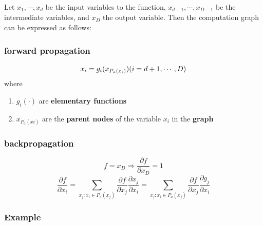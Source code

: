 Let $x_1, \cdots , x_d$ be the input variables to the function, $x_{d+1}, \cdots , x_{D-1}$ be the intermediate variables, and $x_D$ the output variable. Then the computation graph can be expressed as follows:


\subsubsection*{forward propagation}
\[
    x_i = g_i(x_{P_a(x_i)}) \hfill (i = d+1, \cdots, D)
\]
where
\begin{enumerate}
    \item $g_i(\cdot)$ are \textbf{elementary functions}

    \item $x_{P_a(xi)}$ are the \textbf{parent nodes} of the variable $x_i$ in the \textbf{graph}

\end{enumerate}

\subsubsection*{backpropagation}
\[
    f = x_D \Rightarrow \dfrac{\partial f}{\partial x_D} = 1
\]
\[
    \displaystyle 
    \dfrac{\partial f}{ \partial x_i} = 
    \sum_{x_j:x_i\in P_a(x_j)} \dfrac{\partial f}{\partial x_j} \dfrac{\partial x_j}{\partial x_i} =
    \sum_{x_j:x_i\in P_a(x_j)} \dfrac{\partial f}{\partial x_j} \dfrac{\partial g_j}{\partial x_i} 
\]

  

\subsubsection*{Example}

